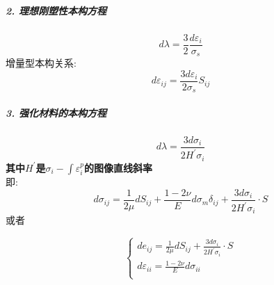 \documentclass[UTF8]{ctexart}
\begin{document}
\hypertarget{ux7406ux60f3ux521aux5851ux6027ux672cux6784ux65b9ux7a0b}{%
\subparagraph{2.
理想刚塑性本构方程}\label{ux7406ux60f3ux521aux5851ux6027ux672cux6784ux65b9ux7a0b}}

{\[d\lambda = \frac{3}{2}\frac{d\varepsilon_{i}}{\sigma_{s}}\]}增量型本构关系:\\
{\[d\varepsilon_{ij} = \frac{3d\varepsilon_{i}}{2\sigma_{s}}S_{ij}\]}

\hypertarget{ux5f3aux5316ux6750ux6599ux7684ux672cux6784ux65b9ux7a0b}{%
\subparagraph{3.
强化材料的本构方程}\label{ux5f3aux5316ux6750ux6599ux7684ux672cux6784ux65b9ux7a0b}}

{\[d\lambda = \frac{3d\sigma_{i}}{2H^{\prime}\sigma_{i}}\]}\textbf{其中{\(H^{\prime}\)}是{\(\sigma_{i} - \int\varepsilon_{i}^{p}\)}的图像直线斜率}\\
即:\\
{\[\boxed{d\sigma_{ij} = \frac{1}{2\mu}dS_{ij} + \frac{1 - 2\nu}{E}d\sigma_{m}\delta_{ij} + \frac{3d\sigma_{i}}{2H^{\prime}\sigma_{i}} \cdot S}\]}或者

\[\left\{ \begin{matrix}
{de_{ij} = \frac{1}{2\mu}dS_{ij} + \frac{3d\sigma_{i}}{2H^{\prime}\sigma_{i}} \cdot S} \\
{d\varepsilon_{ii} = \frac{1 - 2\nu}{E}d\sigma_{ii}} \\
\end{matrix} \right.\]
\end{document}

